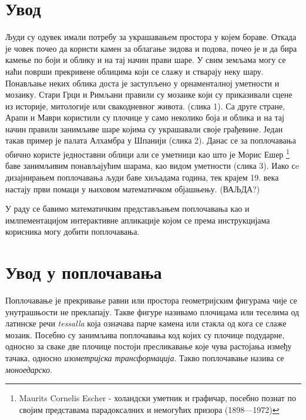 \documentclass[12pt]{report}
\begin{document}
\chapter{Увод}
Људи су одувек имали потребу за украшавањем простора у којем бораве.  Откада је човек почео да користи камен за облагање зидова и подова, почео је и да бира камење по боји и облику и на тај начин прави шаре.
У свим земљама могу се наћи површи прекривене облицима који се слажу и стварају неку шару. Понављање неких облика доста је заступљено у орнаменталној уметности и мозаику.
Стари Грци и Римљани правили су мозаике који су приказивали сцене из историје, митологије или свакодневног живота. (слика 1). Са друге стране, Арапи и Маври користили су плочице у само неколико боја и облика и на тај начин правили занимљиве шаре којима су украшавали своје грађевине. Један такав пример је палата Алхамбра у Шпанији (слика 2). Данас се за поплочавања обично користе једноставни облици али се уметници као што је Морис Ешер \footnote{Maurits Cornelis Escher - холандски уметник и графичар, посебно познат по својим представама парадоксалних и немогућих призора (1898—1972)} баве занимљивим понављајућим шарама, као видом уметности (слика 3).
Иако сe дизајнирањем поплочавања људи баве хиљадама година, тек крајем 19. века настају први помаци у њиховом математичком објашњењу. (ВАЉДА?)

У раду се бавимо математичким представљањем поплочавања као и имлпементацијом интерактивне апликације којом се према инструкцијама корисника могу добити поплочавања.





\chapter{Увод у поплочавања}\label{kristalografske-grupe-i-poploux10davanje}
Поплочавање је прекривање равни или простора геометријским фигурама чије се унутрашњости не преклапају. Такве фигуре називамо плочицама или теселима од латинске речи \emph{tessalla} која означава парче камена или стакла од кога се слаже мозаик. Посебно
су занимљива поплочавања код којих су плочице подударне, односно за сваке две плочице постоји пресликавање које чува растојања између тачака, односно \emph{изометријска трансформација}. Такво поплочавање назива се \emph{моноедарско}.
\end{document}
